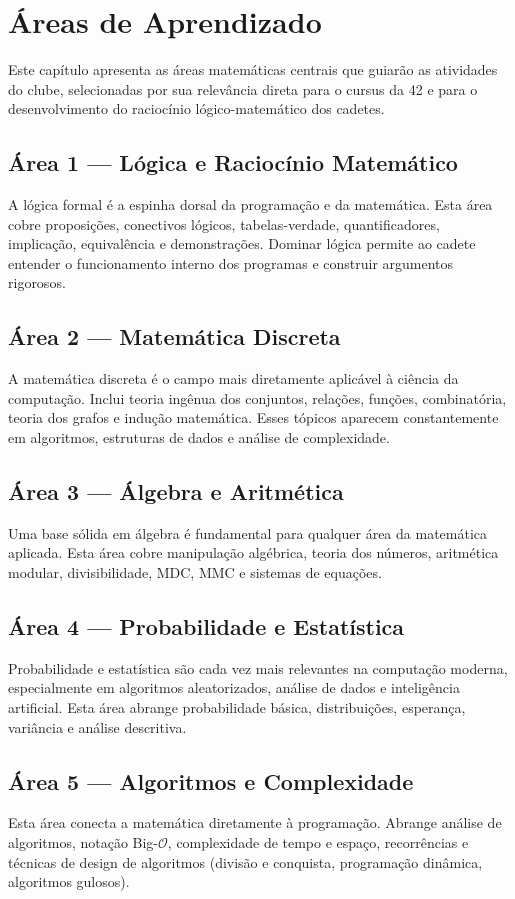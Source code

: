 \clearpage

\section{Áreas de Aprendizado}

Este capítulo apresenta as áreas matemáticas centrais que guiarão as atividades do clube,
selecionadas por sua relevância direta para o cursus da 42 e para o desenvolvimento do
raciocínio lógico-matemático dos cadetes.

\subsection{Área 1 --- Lógica e Raciocínio Matemático}

A lógica formal é a espinha dorsal da programação e da matemática. Esta área cobre
proposições, conectivos lógicos, tabelas-verdade, quantificadores, implicação, equivalência
e demonstrações. Dominar lógica permite ao cadete entender o funcionamento interno dos
programas e construir argumentos rigorosos.

\subsection{Área 2 --- Matemática Discreta}

A matemática discreta é o campo mais diretamente aplicável à ciência da computação. Inclui
teoria ingênua dos conjuntos, relações, funções, combinatória, teoria dos grafos e indução
matemática. Esses tópicos aparecem constantemente em algoritmos, estruturas de dados e
análise de complexidade.

\subsection{Área 3 --- Álgebra e Aritmética}

Uma base sólida em álgebra é fundamental para qualquer área da matemática aplicada. Esta
área cobre manipulação algébrica, teoria dos números, aritmética modular, divisibilidade,
MDC, MMC e sistemas de equações.

\subsection{Área 4 --- Probabilidade e Estatística}

Probabilidade e estatística são cada vez mais relevantes na computação moderna,
especialmente em algoritmos aleatorizados, análise de dados e inteligência artificial.
Esta área abrange probabilidade básica, distribuições, esperança, variância e análise
descritiva.

\subsection{Área 5 --- Algoritmos e Complexidade}

Esta área conecta a matemática diretamente à programação. Abrange análise de algoritmos,
notação Big-$\mathcal{O}$, complexidade de tempo e espaço, recorrências e técnicas de
design de algoritmos (divisão e conquista, programação dinâmica, algoritmos gulosos).
